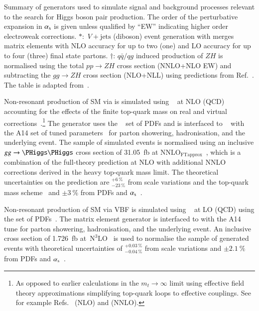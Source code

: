 \begin{sidewaystable}[p]
  \centering

  \caption{Summary of generators used to simulate signal and
    background processes relevant to the search for Higgs boson pair
    production. The order of the perturbative expansion in $\alpha_{\text{s}}$
    is given unless qualified by ``EW'' indicating higher order
    electroweak corrections. $*$:~$V+\text{jets}$ (diboson) event
    generation with \SHERPA[2.2.1] merges matrix elements with NLO
    accuracy for up to two (one) and LO accuracy for up to four
    (three) final state partons. $\dagger$: $q\bar{q} / qg$ induced
    production of $ZH$ is normalised using the total $pp \to ZH$ cross
    section (NNLO+NLO EW) and subtracting the $gg \to ZH$ cross
    section (NLO+NLL) using predictions from
    Ref.~\cite{deFlorian:2016spz}. The table is adapted
    from~\cite{ATLAS-CONF-2021-030}.}%
  \label{tab:monte_carlo}

  \resizebox{\textwidth}{!}{}
\end{sidewaystable}

Non-resonant production of SM \HH via \ggF is simulated using
\POWHEGBOX[v2]~\cite{Nason:2004rx,Frixione:2007vw,Alioli:2010xd} at
NLO (QCD) accounting for the effects of the finite top-quark mass on
real and virtual
corrections~\cite{Borowka:2016ehy,Baglio:2018lrj,Heinrich:2017kxx,Heinrich:2019bkc,Heinrich:2020ckp}.\footnote{As
  opposed to earlier calculations in the $m_{t} \to \infty$ limit
  using effective field theory approximations simplifying top-quark
  loops to effective couplings. See for example
  Refs.~\cite{Dawson:1998py} (NLO) and \cite{deFlorian:2013jea}
  (NNLO).} The generator uses the
\PDFforLHC[15nlo]~\cite{Butterworth:2015oua} set of PDFs and is
interfaced to \PYTHIA[8]~\cite{Sjostrand:2014zea} with the A14 set of
tuned parameters~\cite{ATL-PHYS-PUB-2014-021} for parton showering,
hadronisation, and the underlying event. The sample of simulated
events is normalised using an inclusive $gg \to \HH$ cross section of
\SI{31.05}{\femto\barn} at
$\text{NNLO}_{\text{FTapprox}}$~\cite{Grazzini:2018bsd}, which is a
combination of the full-theory prediction at NLO with additional NNLO
corrections derived in the heavy top-quark mass limit. The theoretical
uncertainties on the prediction are $^{+6\,\%}_{-23\,\%}$ from scale
variations and the top-quark mass scheme~\cite{Baglio:2020wgt} and
$\pm\SI{3}{\percent}$ from PDFs and $\alpha_{\text{s}}$~\cite{LHCHWGHH}.

Non-resonant production of SM \HH via VBF is simulated using
\MGNLO~\cite{Alwall:2014hca} %
at LO (QCD) %
using the \NNPDF[3.0nlo] set of PDFs~\cite{Ball:2014uwa}. The matrix
element generator is interfaced to \PYTHIA[8] with the A14 tune for
parton showering, hadronisation, and the underlying event. An
inclusive cross section of \SI{1.726}{\femto\barn}
at~$\text{N}^3\text{LO}$~\cite{Dreyer:2018qbw,LHCHWGHH} is used to
normalise the sample of generated events with theoretical
uncertainties of $^{+0.03\,\%}_{-0.04\,\%}$ from scale variations and
$\pm\SI{2.1}{\percent}$ from PDFs and $\alpha_{\text{s}}$~\cite{LHCHWGHH}.

